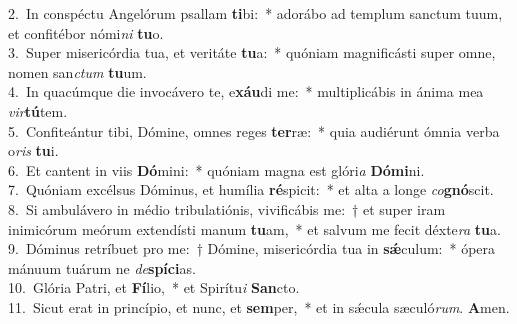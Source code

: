 {2.~}In conspéctu Angelórum psallam \textbf{ti}bi:~* adorábo ad templum sanctum tuum, et confitébor nómi\textit{ni} \textbf{tu}o.\\
{3.~}Super misericórdia tua, et veritáte \textbf{tu}a:~* quóniam magnificásti super omne, nomen san\textit{ctum} \textbf{tu}um.\\
{4.~}In quacúmque die invocávero te, e\textbf{xáu}di me:~* multiplicábis in ánima mea \textit{vir}\textbf{tú}tem.\\
{5.~}Confiteántur tibi, Dómine, omnes reges \textbf{ter}ræ:~* quia audiérunt ómnia verba o\textit{ris} \textbf{tu}i.\\
{6.~}Et cantent in viis \textbf{Dó}mini:~* quóniam magna est glóri\textit{a} \textbf{Dó}\textbf{mi}ni.\\
{7.~}Quóniam excélsus Dóminus, et humília \textbf{ré}spicit:~* et alta a longe \textit{co}\textbf{gnó}scit.\\
{8.~}Si ambulávero in médio tribulatiónis, vivificábis me:~† et super iram inimicórum meórum extendísti manum \textbf{tu}am,~* et salvum me fecit déxte\textit{ra} \textbf{tu}a.\\
{9.~}Dóminus retríbuet pro me:~† Dómine, misericórdia tua in \textbf{sǽ}culum:~* ópera mánuum tuárum ne \textit{de}\textbf{spí}\textbf{ci}as.\\
{10.~}Glória Patri, et \textbf{Fí}lio,~* et Spirítu\textit{i} \textbf{San}cto.\\
{11.~}Sicut erat in princípio, et nunc, et \textbf{sem}per,~* et in sǽcula sæculó\textit{rum}. \textbf{A}men.\\
